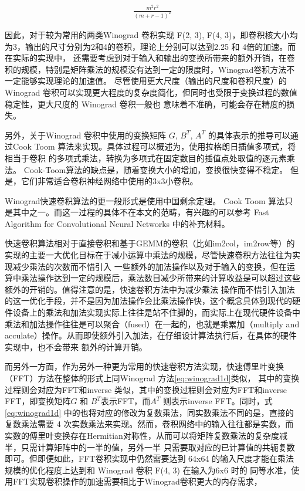 \begin{align}
  \label{eq:winograd_reduction}
  \frac{m^2r^2}{(m+r-1)^2}
\end{align}

因此，对于较为常用的两类Winograd 卷积实现 F(2, 3), F(4, 3)，即卷积核大小均为3，输出的尺寸分别为2和4的卷积，理论上分别可以达到2.25 和 4倍的加速。而在实际的实现中，
还需要考虑到对于输入和输出的变换所带来的额外开销，在卷积的规模，特别是矩阵乘法的规模没有达到一定的限度时，Winograd卷积方法不一定能够实现理论的加速值。
尽管使用更大尺度（输出的尺度和卷积尺度）的Winograd 卷积可以实现更大程度的复杂度简化，但同时也受限于变换过程的数值稳定性，更大尺度的 Winograd 卷积一般也
意味着不准确，可能会存在精度的损失。

另外，关于Winograd 卷积中使用的变换矩阵 $G$, $B^T$, $A^T$ 的具体表示的推导可以通过Cook Toom 算法来实现。具体过程可以概述为，使用拉格朗日插值多项式，将相当于卷积
的多项式乘法，转换为多项式在固定数目的插值点处取值的逐元素乘法。 Cook-Toom算法的缺点是，随着变换大小的增加，变换很快变得不稳定。 但是，它们非常适合卷积神经网络中使用的3x3小卷积。

Winograd快速卷积算法的更一般形式是使用中国剩余定理。 Cook Toom 算法只是其中之一。而这一过程的具体不在本文的范畴，有兴趣的可以参考 Fast Algorithm for Convolutional 
Neural Networks 中的补充材料。


快速卷积算法相对于直接卷积和基于GEMM的卷积（比如im2col，im2row等）的实现的主要一大优化目标在于减小运算中乘法的规模，尽管快速卷积方法往往为实现减少乘法的次数而不惜引入
一些额外的加法操作以及对于输入的变换，但在运算中乘法操作达到一定的规模后，乘法数目减少所带来的计算收益是可以超过这些额外的开销的。值得注意的是，快速卷积方法中为减少乘法
操作而不惜引入加法的这一优化手段，并不是因为加法操作会比乘法操作快，这个概念具体到现代的硬件设备上的乘法和加法实现实际上往往是站不住脚的，而实际上在现代硬件设备中
乘法和加法操作往往是可以聚合（fused）在一起的，也就是乘累加（multiply and acculate）操作。从而即使额外引入加法，在仔细设计算法执行后，在具体的硬件实现中，也不会带来
额外的计算开销。

而另外一方面，作为另外一种更为常用的快速卷积方法实现，快速傅里叶变换（FFT）方法在整体的形式上同Winograd 方法\ref{eq:winograd1d}类似，
其中的变换过程则会对应为FFT和inverse 类似，其中的变换过程则会对应为FFT和inverse
 FFT，即变换矩阵$G$ 和 $B^T$表示FFT，而$A^T$ 则表示inverse FFT。同时，式\ref{eq:winograd1d} 中的也将对应的修改为复数乘法，同实数乘法不同的是，直接的复数乘法需要
 4 次实数乘法来实现。然而，卷积网络中的输入往往都是实数，而实数的傅里叶变换存在Hermitian对称性，从而可以将矩阵复数乘法的复杂度减半，只需计算矩阵中的一半的值，另外一半
 只需要取对应的已计算值的共轭复数即可。但即便如此，FFT卷积实现中仍然需要达到 64x64 的输入尺度才能在乘法规模的优化程度上达到和 Winograd 卷积 F(4, 3) 在输入为6x6 时的
 同等水准，使用FFT实现卷积操作的加速需要相比于Winograd卷积更大的内存需求，

